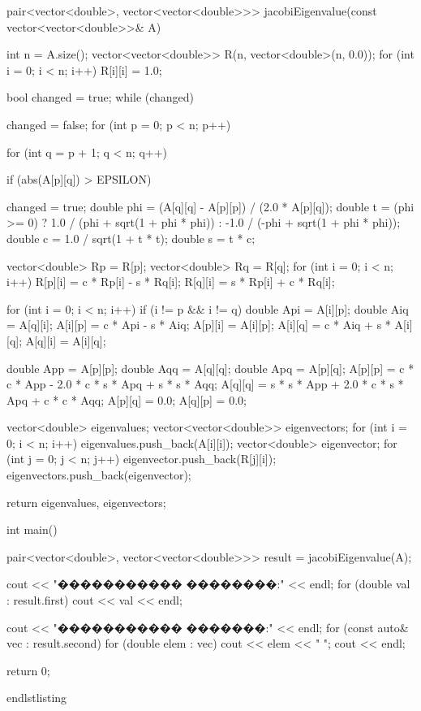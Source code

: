 pair<vector<double>, vector<vector<double>>> jacobiEigenvalue(const vector<vector<double>>& A) {
    int n = A.size();
    vector<vector<double>> R(n, vector<double>(n, 0.0));
    for (int i = 0; i < n; i++) {
        R[i][i] = 1.0;
    }

    bool changed = true;
    while (changed) {
        changed = false;
        for (int p = 0; p < n; p++) {
            for (int q = p + 1; q < n; q++) {
                if (abs(A[p][q]) > EPSILON) {
                    changed = true;
                    double phi = (A[q][q] - A[p][p]) / (2.0 * A[p][q]);
                    double t = (phi >= 0) ? 1.0 / (phi + sqrt(1 + phi * phi)) : -1.0 / (-phi + sqrt(1 + phi * phi));
                    double c = 1.0 / sqrt(1 + t * t);
                    double s = t * c;

                    vector<double> Rp = R[p];
                    vector<double> Rq = R[q];
                    for (int i = 0; i < n; i++) {
                        R[p][i] = c * Rp[i] - s * Rq[i];
                        R[q][i] = s * Rp[i] + c * Rq[i];
                    }

                    for (int i = 0; i < n; i++) {
                        if (i != p && i != q) {
                            double Api = A[i][p];
                            double Aiq = A[q][i];
                            A[i][p] = c * Api - s * Aiq;
                            A[p][i] = A[i][p];
                            A[i][q] = c * Aiq + s * A[i][q];
                            A[q][i] = A[i][q];
                        }
                    }

                    double App = A[p][p];
                    double Aqq = A[q][q];
                    double Apq = A[p][q];
                    A[p][p] = c * c * App - 2.0 * c * s * Apq + s * s * Aqq;
                    A[q][q] = s * s * App + 2.0 * c * s * Apq + c * c * Aqq;
                    A[p][q] = 0.0;
                    A[q][p] = 0.0;
                }
            }
        }
    }

    vector<double> eigenvalues;
    vector<vector<double>> eigenvectors;
    for (int i = 0; i < n; i++) {
        eigenvalues.push_back(A[i][i]);
        vector<double> eigenvector;
        for (int j = 0; j < n; j++) {
            eigenvector.push_back(R[j][i]);
        }
        eigenvectors.push_back(eigenvector);
    }

    return {eigenvalues, eigenvectors};
}

int main() {
    pair<vector<double>, vector<vector<double>>> result = jacobiEigenvalue(A);
    
    cout << "����������� ��������:" << endl;
    for (double val : result.first) {
        cout << val << endl;
    }
    
    cout << "����������� �������:" << endl;
    for (const auto& vec : result.second) {
        for (double elem : vec) {
            cout << elem << " ";
        }
        cout << endl;
    }

    return 0;
}
end{lstlisting}
